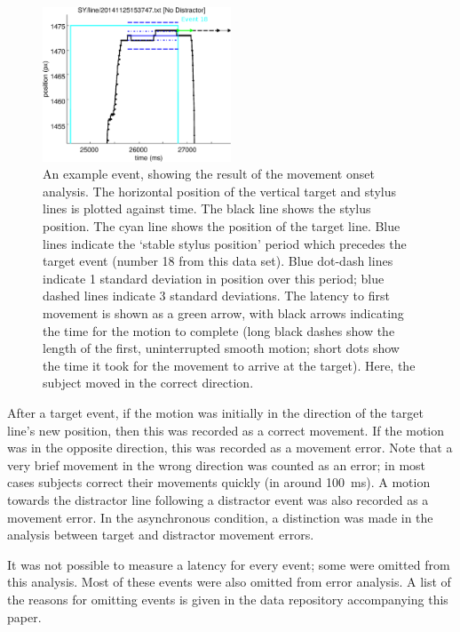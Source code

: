 \documentclass[10pt,letterpaper]{article}
\begin{document}
\begin{figure}[htb!]
\centering
\includegraphics[width=0.5\textwidth]{./figures/example1_nolegend.eps}
\caption[Obtaining the latency, method 1] {An example event, showing
  the result of the movement onset analysis. The horizontal position
  of the vertical target and stylus lines is plotted against time. The
  black line shows the stylus position. The cyan line shows the
  position of the target line. Blue lines indicate the `stable stylus
  position' period which precedes the target event (number 18 from
  this data set). Blue dot-dash lines indicate 1 standard deviation in
  position over this period; blue dashed lines indicate 3 standard
  deviations. The latency to first movement is shown as a green arrow,
  with black arrows indicating the time for the motion to complete
  (long black dashes show the length of the first, uninterrupted
  smooth motion; short dots show the time it took for the movement to
  arrive at the target). Here, the subject moved in the correct
  direction.}
\label{example_event}
\end{figure}

After a target event, if the motion was initially in the direction of
the target line's new position, then this was recorded as a correct
movement. If the motion was in the opposite direction, this was
recorded as a movement error. Note that a very brief movement in the
wrong direction was counted as an error; in most cases subjects
correct their movements quickly (in around 100~ms). A motion towards
the distractor line following a distractor event was also recorded as
a movement error. In the asynchronous condition, a distinction was
made in the analysis between target and distractor movement errors.

It was not possible to measure a latency for every event; some were
omitted from this analysis. Most of these events were also omitted
from error analysis.
A list of the reasons for omitting events is given in the data
repository accompanying this paper.
\end{document}
